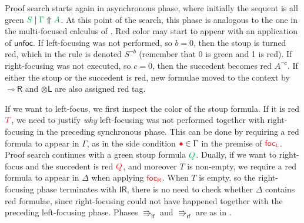 \documentclass[runningheads]{llncs}
\newcommand{\tl}{\otimes \mathsf{L}}
\newcommand{\tr}{\otimes \mathsf{R}}
\newcommand{\lright}{{\multimap}\mathsf{R}}
\newcommand{\lleft}{{\multimap}\mathsf{L}}
\newcommand{\pass}{\mathsf{pass}}
\newcommand{\unitr}{\mathsf{IR}}
\newcommand{\otL}{\tl}
\newcommand{\otR}{\tr}
\newcommand{\lolliR}{\lright}
\newcommand{\lolliL}{\lleft}
\newcommand{\IR}{\unitr}
\newcommand{\lf}{\Rrightarrow_\mathsf{lf}}
\newcommand{\rf}{\Rrightarrow_\mathsf{rf}}
\newcommand{\red}[1]{{\color{Red}#1}}
\newcommand{\green}[1]{{\color{Green}#1}}
\newcommand{\up}{\Uparrow}
\newcommand{\focL}{\mathsf{foc_L}}
\newcommand{\focR}{\mathsf{foc_R}}
\newcommand{\unfoc}{\mathsf{unfoc}}
\begin{document}
Proof search starts again in asynchronous phase, where initially the sequent is all green $\green{S} \mid \green{\Gamma} \up \green{A}$. At this point of the search, this phase is analogous to the one in the multi-focused calculus of . Red color may start to appear with an application of $\unfoc$. If left-focusing was not performed, so $b = 0$, then the stoup is turned red, which in the rule is denoted $S^{\neg b}$ (remember that 0 is green and 1 is red). If right-focusing was not executed, so $c = 0$, then the succedent becomes red $A^{\neg c}$. If either the stoup or the succedent is red, new formulae moved to the context by $\lolliR$ and $\otL$ are also assigned red tag.

If we want to left-focus, we first inspect the color of the stoup formula. If it is red $\red{T}$, we need to justify \emph{why} left-focusing was not performed together with right-focusing in the preceding synchronous phase. This can be done by requiring a red formula to appear in $\Gamma$, as in the side condition $\red{\bullet} \in \Gamma$ in the premise of $\red{\focL}$. Proof search continues with a green stoup formula $\green{Q}$. Dually, if we want to right-focus and the succedent is red $\red{Q}$, and moreover $T$ is non-empty, we require a red formula to appear in $\Delta$ when applying $\red{\focR}$. When $T$ is empty, so the right-focusing phase terminates with $\IR$, there is no need to check whether $\Delta$ contains red formulae, since right-focusing could not have happened together with the preceding left-focusing phase. Phases $\lf$ and $\rf$ are as in .


\end{document}
